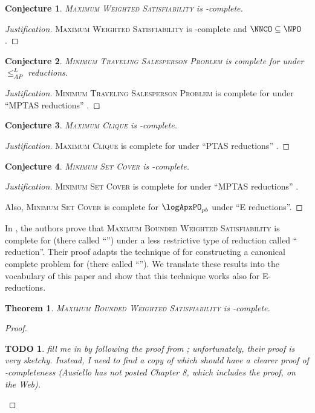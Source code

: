 \documentclass[]{article}
\theoremstyle{plain}
\newtheorem{conjecture}{Conjecture}
\newtheorem{theorem}{Theorem}
\newtheorem{todo}{TODO}
\theoremstyle{definition}
\newenvironment{justification}{\begin{proof}[Justification]}{\end{proof}}
\newcommand{\APr}{\leq_{AP}^{L}}
\begin{document}
\begin{conjecture}
  \textsc{Maximum Weighted Satisfiability} is \NNCO-complete.
\end{conjecture}
\begin{justification}
  \textsc{Maximum Weighted Satisfiability} is \NPO-complete \cite{ckst95} and $\NNCO\subseteq\NPO$.
\end{justification}

\begin{conjecture}
  \textsc{Minimum Traveling Salesperson Problem} is complete for \expApxNCO{} under $\APr$ reductions.
\end{conjecture}
\begin{justification}
  \textsc{Minimum Traveling Salesperson Problem} is complete for \expApxPO{} under ``MPTAS reductions'' \cite[Corollary~1]{ep06}.
\end{justification}

\begin{conjecture}
  \textsc{Maximum Clique} is \polyApxNCO-complete.
\end{conjecture}
\begin{justification}
  \textsc{Maximum Clique} is complete for \polyApxPO{} under ``PTAS reductions'' \cite[Example~2.48]{cks01} \cite{kmsv99} \cite{ep10}.
\end{justification}

\begin{conjecture}
  \textsc{Minimum Set Cover} is \logApxNCO-complete.
\end{conjecture}
\begin{justification}
  \textsc{Minimum Set Cover} is complete for \logApxPO{} under ``MPTAS reductions'' \cite[Example~2.48]{cks01} \cite[Theorem~5]{ep06} \cite[Theorem~27]{ep10}.

  Also, \textsc{Minimum Set Cover} is complete for $\logApxPO_{pb}$ under ``E reductions''.
\end{justification}

In \cite{sx95}, the authors prove that \textsc{Maximum Bounded Weighted Satisfiability} is complete for \ApxNCO{} (there called ``\NCX'') under a less restrictive type of reduction called ``\NCAS{} reduction''.
Their proof adapts the technique of \cite{cp91} for constructing a canonical complete problem for \ApxPO{} (there called ``\APX'').
We translate these results into the vocabulary of this paper and show that this technique works also for E-reductions.
\begin{theorem}
  \textsc{Maximum Bounded Weighted Satisfiability} is \ApxNCO-complete.
\end{theorem}
\begin{proof}
  \begin{todo}
    fill me in by following the proof from \cite{sx95}; unfortunately, their proof is very sketchy.
    Instead, I need to find a copy of \cite{acgkmp99} which should have a clearer proof of \ApxPO-completeness (Ausiello has not posted Chapter 8, which includes the proof, on the Web).
  \end{todo}
\end{proof}
\end{document}
